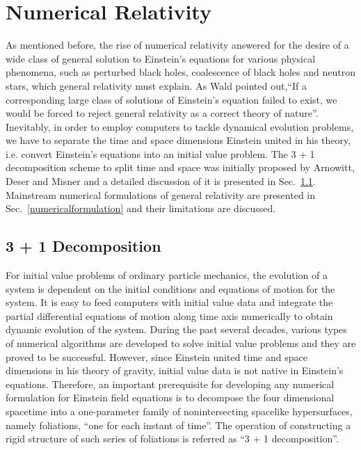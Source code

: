 \chapter{Numerical Relativity}\label{nr}
As mentioned before, the rise of numerical relativity answered for the desire of a wide class of general solution to Einstein's equations for various physical phenomena, such as perturbed black holes, coalescence of black holes and neutron stars, which general relativity must explain. As Wald pointed out,``If a corresponding large class of solutions of Einstein's equation failed to exist, we would be forced to reject general relativity as a correct theory of nature''\cite{Wald}. Inevitably, in order to employ computers to tackle dynamical evolution problems, we have to separate the time and space dimensions Einstein united in his theory, i.e. convert Einstein's equations into an initial value problem. The 3 + 1 decomposition scheme to split time and space was initially proposed by Arnowitt, Deser and Misner\cite{ADM:Witten} and a detailed discussion of it is presented in Sec.~\ref{3+1}. Mainstream numerical formulations of general relativity are presented in Sec.~\ref{numericalformulation} and their limitations are discussed. 
\section{3 + 1 Decomposition}\label{3+1}
For initial value problems of ordinary particle mechanics, the evolution of a system is dependent on the initial conditions and equations of motion for the system. It is easy to feed computers with initial value data and integrate the partial differential equations of motion along time axis numerically to obtain dynamic evolution of the system. During the past several decades, various types of numerical algorithms are developed to solve initial value problems and they are proved to be successful. However, since Einstein united time and space dimensions in his theory of gravity, initial value data is not native in Einstein's equations. Therefore, an important prerequisite for developing any numerical formulation for Einstein field equations is to decompose the four dimensional spacetime into a one-parameter family of nonintersecting spacelike hypersurfaces, namely foliations, ``one for each instant of time''. The operation of constructing a rigid structure of such series of foliations is referred as ``3 + 1 decomposition''. 

